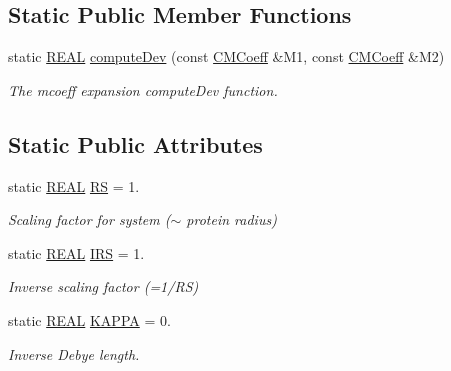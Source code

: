 \subsection*{Static Public Member Functions}
\begin{DoxyCompactItemize}
\item 
static \hyperlink{util_8h_a5821460e95a0800cf9f24c38915cbbde}{R\-E\-A\-L} \hyperlink{classCMCoeff_af24efe3725c507a1919b043a5335d9ff}{compute\-Dev} (const \hyperlink{classCMCoeff}{C\-M\-Coeff} \&M1, const \hyperlink{classCMCoeff}{C\-M\-Coeff} \&M2)
\begin{DoxyCompactList}\small\item\em The mcoeff expansion compute\-Dev function. \end{DoxyCompactList}\end{DoxyCompactItemize}
\subsection*{Static Public Attributes}
\begin{DoxyCompactItemize}
\item 
static \hyperlink{util_8h_a5821460e95a0800cf9f24c38915cbbde}{R\-E\-A\-L} \hyperlink{classCMCoeff_a512caa3ff1994cbde85011489b8f34ce}{R\-S} = 1.
\begin{DoxyCompactList}\small\item\em Scaling factor for system ($\sim$ protein radius) \end{DoxyCompactList}\item 
static \hyperlink{util_8h_a5821460e95a0800cf9f24c38915cbbde}{R\-E\-A\-L} \hyperlink{classCMCoeff_a7e893ff6deb29f85472663fffd995f42}{I\-R\-S} = 1.
\begin{DoxyCompactList}\small\item\em Inverse scaling factor (=1/\-R\-S) \end{DoxyCompactList}\item 
static \hyperlink{util_8h_a5821460e95a0800cf9f24c38915cbbde}{R\-E\-A\-L} \hyperlink{classCMCoeff_a468f6af1ba4ddbe13561217488c87b40}{K\-A\-P\-P\-A} = 0.
\begin{DoxyCompactList}\small\item\em Inverse Debye length. \end{DoxyCompactList}\end{DoxyCompactItemize}

